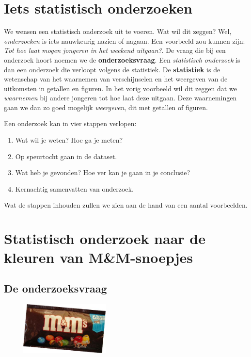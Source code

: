 \documentclass[12pt,twoside]{article}
\begin{document}
\section{Iets statistisch onderzoeken}

We wensen een statistisch onderzoek uit te voeren. Wat wil dit zeggen? Wel, {\it onderzoeken} is iets nauwkeurig nazien of nagaan. Een voorbeeld zou kunnen zijn: {\it Tot hoe laat mogen jongeren in het weekend uitgaan?}. De vraag die bij een onderzoek hoort noemen we de {\bf onderzoeksvraag}. Een {\it statistisch onderzoek} is dan een onderzoek die verloopt volgens de statistiek. De {\bf statistiek} is de wetenschap van het waarnemen van verschijnselen en het weergeven van de uitkomsten in getallen en figuren. In het vorig voorbeeld wil dit zeggen dat we {\it waarnemen} bij andere jongeren tot hoe laat deze uitgaan. Deze waarnemingen gaan we dan zo goed mogelijk {\it weergeven}, dit met getallen of figuren.

Een onderzoek kan in vier stappen verlopen:
\begin{enumerate}
  \item Wat wil je weten? Hoe ga je meten?
  \item Op speurtocht gaan in de dataset.
  \item Wat heb je gevonden? Hoe ver kan je gaan in je conclusie?
  \item Kernachtig samenvatten van onderzoek.
\end{enumerate}

Wat de stappen inhouden zullen we zien aan de hand van een aantal voorbeelden.

\section{Statistisch onderzoek naar de kleuren van M\&M-snoepjes}

\subsection{De onderzoeksvraag}

\begin{figure}
  \includegraphics[width=0.4\textwidth]{MenM-verpakking.png}
\end{figure}
\end{document}

